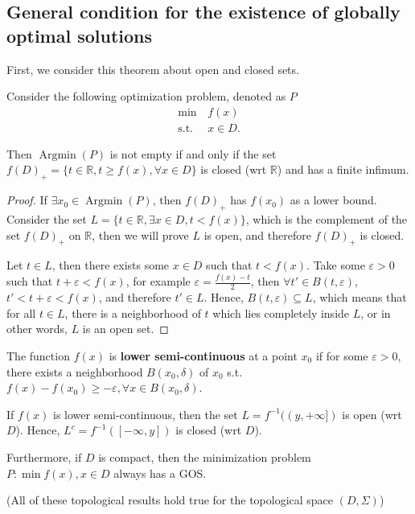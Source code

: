 
\subsection{General condition for the existence of globally optimal solutions} %
\label{sub:General condition for the existence of globally optimal solutions}

First, we consider this theorem about open and closed sets.

\begin{theorem}
  Consider the following optimization problem, denoted as \( P \)
  \begin{align*}
    \min\, &f(x)\\
    \text{s.t.}\, &x \in D
  .\end{align*}

  Then \( \operatorname{Argmin}(P) \) is not empty if and only if the set \(
  f(D)_{+} = \{t \in \mathbb{R}, t \ge f(x), \forall x \in D\}   \) is closed
  (wrt \( \mathbb{R} \)) and
  has a finite infimum.
\end{theorem}

\begin{proof}
  If \( \exists x_{0} \in \operatorname{Argmin}(P) \), then \( f(D)_{+}
  \) has \( f(x_{0}) \) as a lower bound. Consider the set \( L = \{t \in
  \mathbb{R}, \exists x\in D, t < f(x)\}   \), which is the complement of
  the set \( f(D)_{+} \) on \( \mathbb{R} \), then we will prove \( L \) is
  open, and therefore \( f(D)_{+} \) is closed.

  Let \( t \in L \), then there exists some \( x \in D \) such that \( t <
  f(x) \). Take some \( \varepsilon > 0 \) such that \( t + \varepsilon <
  f(x) \), for example \( \varepsilon = \frac{f(x) - t}{2} \), then 
  \( \forall t' \in B(t, \varepsilon) \), \( t' < t + \varepsilon <
  f(x) \), and therefore \( t' \in L \). Hence, \( B(t, \varepsilon) \subseteq
  L\), which means that for all \( t \in L \), there is a neighborhood of \(
  t\) which lies completely inside \( L \), or in other words, \( L \) is an
  open set.
\end{proof}

\begin{theorem}
\label{thr:LSC compact condition}
  The function \( f(x) \) is \textbf{lower semi-continuous} at a point \( x_{0} \) if for
  some \( \varepsilon > 0 \), there exists a neighborhood \( B(x_{0}, \delta) \) of
  \( x_{0} \) s.t. \( f(x) - f(x_{0}) \ge  -\varepsilon, \forall x \in B(x_{0},
  \delta)\).

  If \( f(x) \) is lower semi-continuous, then the set \( L = f^{-1}((y,
  +\infty]) \) is open (wrt \( D \)). Hence, \( L^{c} = f^{-1}([-\infty, y]) \)
  is closed (wrt \( D \)).

  Furthermore, if \( D \) is compact, then the minimization problem
  \( P: \min f(x), x \in D \) always has a GOS.

  (All of these topological results hold true for the topological space \( (D,
  \Sigma) \))
\end{theorem}


